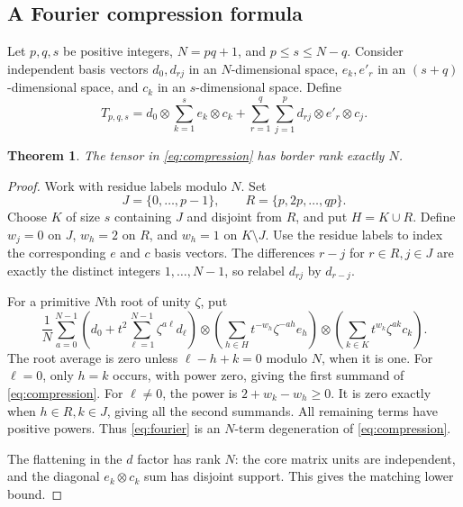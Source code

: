 \documentclass[11pt]{article}
\newtheorem{theorem}{Theorem}[section]
\theoremstyle{definition}\newtheorem{definition}[theorem]{Definition}
\theoremstyle{remark}\newtheorem{remark}[theorem]{Remark}
\begin{document}
\subsection{A Fourier compression formula}

Let $p,q,s$ be positive integers, $N=pq+1$, and $p\leq s\leq N-q$.
Consider independent basis vectors $d_0,d_{rj}$ in an $N$-dimensional space,
$e_k,e'_r$ in an $(s+q)$-dimensional space, and $c_k$ in an $s$-dimensional
space. Define
\begin{equation}\label{eq:compression}
 T_{p,q,s}=d_0\otimes\sum_{k=1}^{s}e_k\otimes c_k
       +\sum_{r=1}^{q}\sum_{j=1}^{p}d_{rj}\otimes e'_r\otimes c_j.
\end{equation}

\begin{theorem}\label{thm:compression}
The tensor in \eqref{eq:compression} has border rank exactly $N$.
\end{theorem}
\begin{proof}
Work with residue labels modulo $N$. Set
\[
 J=\{0,\ldots,p-1\},\qquad R=\{p,2p,\ldots,qp\}.
\]
Choose $K$ of size $s$ containing $J$ and disjoint from $R$, and put $H=K\cup R$.
Define $w_j=0$ on $J$, $w_h=2$ on $R$, and $w_h=1$ on $K\setminus J$.
Use the residue labels to index the corresponding $e$ and $c$ basis vectors.
The differences $r-j$ for $r\in R,j\in J$ are exactly the distinct integers
$1,\ldots,N-1$, so relabel $d_{rj}$ by $d_{r-j}$.

For a primitive $N$th root of unity $\zeta$, put
\begin{equation}\label{eq:fourier}
 \frac1N\sum_{a=0}^{N-1}
 \left(d_0+t^2\sum_{\ell=1}^{N-1}\zeta^{a\ell}d_\ell\right)
 \otimes\left(\sum_{h\in H}t^{-w_h}\zeta^{-ah}e_h\right)
 \otimes\left(\sum_{k\in K}t^{w_k}\zeta^{ak}c_k\right).
\end{equation}
The root average is zero unless $\ell-h+k=0$ modulo $N$, when it is one.
For $\ell=0$, only $h=k$ occurs, with power zero, giving the first summand
of \eqref{eq:compression}. For $\ell\ne0$, the power is
$2+w_k-w_h\geq0$. It is zero exactly when $h\in R,k\in J$, giving all the
second summands. All remaining terms have positive powers. Thus
\eqref{eq:fourier} is an $N$-term degeneration of \eqref{eq:compression}.

The flattening in the $d$ factor has rank $N$: the core matrix units are
independent, and the diagonal $e_k\otimes c_k$ sum has disjoint support.
This gives the matching lower bound.
\end{proof}
\end{document}
